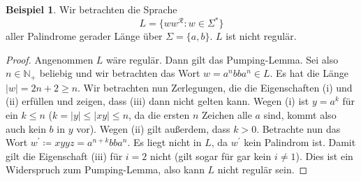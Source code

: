\documentclass[11pt, a4paper]{article}
\theoremstyle{definition}
\newtheorem{example}[definition]{Beispiel}
\theoremstyle{plain}
\numberwithin{equation}{section}
\begin{document}
\begin{example}
	Wir betrachten die Sprache
	$$
		L = \{ ww^\mathcal{R} : w \in \Sigma^\ast \}
	$$
	aller Palindrome gerader Länge über $\Sigma = \{a, b\}$. $L$ ist nicht regulär.
	\begin{proof}
		Angenommen $L$ wäre regulär. Dann gilt das Pumping-Lemma. Sei also $n \in \mathbb{N}_+$ beliebig und wir betrachten das Wort $w = a^n bb a^n \in L$. Es hat die Länge $|w| = 2n+2 \geq n$. Wir betrachten nun Zerlegungen, die die Eigenschaften (i) und (ii) erfüllen und zeigen, dass (iii) dann nicht gelten kann. Wegen (i) ist $y = a^k$ für ein $k \leq n$ ($k = |y| \leq |xy| \leq n$, da die ersten $n$ Zeichen alle $a$ sind, kommt also auch kein $b$ in $y$ vor). Wegen (ii) gilt außerdem, dass $k > 0$. Betrachte nun das Wort $w^\prime \coloneqq xyyz = a^{n+k}bba^n$. Es liegt nicht in $L$, da $w^\prime$ kein Palindrom ist. Damit gilt die Eigenschaft (iii) für $i = 2$ nicht (gilt sogar für gar kein $i \neq 1$). Dies ist ein Widerspruch zum Pumping-Lemma, also kann $L$ nicht regulär sein. 
	\end{proof}
\end{example}
\end{document}
